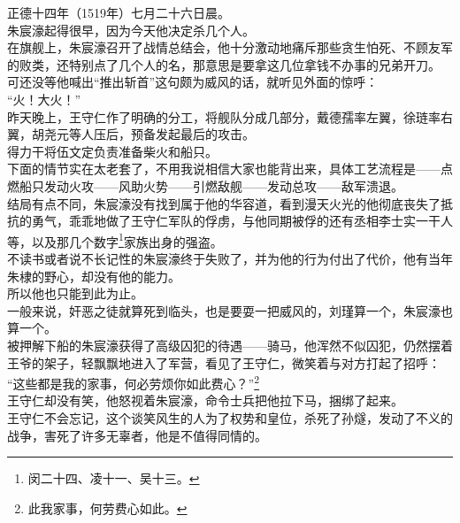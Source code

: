 \begin{multicols}{\theparacolNo}
正德十四年（1519年）七月二十六日晨。\\

朱宸濠起得很早，因为今天他决定杀几个人。\\

在旗舰上，朱宸濠召开了战情总结会，他十分激动地痛斥那些贪生怕死、不顾友军的败类，还特别点了几个人的名，那意思是要拿这几位拿钱不办事的兄弟开刀。\\

可还没等他喊出“推出斩首”这句颇为威风的话，就听见外面的惊呼：\\

“火！大火！”\\

昨天晚上，王守仁作了明确的分工，将舰队分成几部分，戴德孺率左翼，徐琏率右翼，胡尧元等人压后，预备发起最后的攻击。\\

得力干将伍文定负责准备柴火和船只。\\

下面的情节实在太老套了，不用我说相信大家也能背出来，具体工艺流程是——点燃船只发动火攻——风助火势——引燃敌舰——发动总攻——敌军溃退。\\

结局有点不同，朱宸濠没有找到属于他的华容道，看到漫天火光的他彻底丧失了抵抗的勇气，乖乖地做了王守仁军队的俘虏，与他同期被俘的还有丞相李士实一干人等，以及那几个数字\footnote{闵二十四、凌十一、吴十三。}家族出身的强盗。\\

不读书或者说不长记性的朱宸濠终于失败了，并为他的行为付出了代价，他有当年朱棣的野心，却没有他的能力。\\

所以他也只能到此为止。\\

一般来说，奸恶之徒就算死到临头，也是要耍一把威风的，刘瑾算一个，朱宸濠也算一个。\\

被押解下船的朱宸濠获得了高级囚犯的待遇——骑马，他浑然不似囚犯，仍然摆着王爷的架子，轻飘飘地进入了军营，看见了王守仁，微笑着与对方打起了招呼：\\

“这些都是我的家事，何必劳烦你如此费心？”\footnote{此我家事，何劳费心如此。}\\

王守仁却没有笑，他怒视着朱宸濠，命令士兵把他拉下马，捆绑了起来。\\

王守仁不会忘记，这个谈笑风生的人为了权势和皇位，杀死了孙燧，发动了不义的战争，害死了许多无辜者，他是不值得同情的。\\


\end{multicols}
